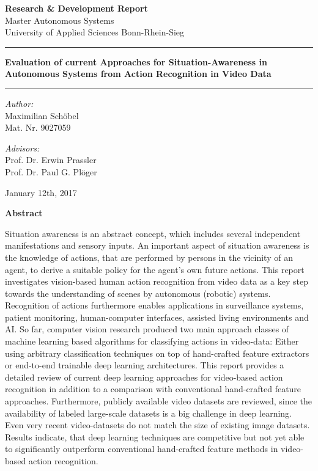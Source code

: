 \documentclass[a4paper, 11pt, listof=totoc, bibliography=totoc]{scrartcl}
\begin{document}
\thispagestyle{empty}
\begin{center}
\large
\textbf{Research \& Development Report} \\
Master Autonomous Systems \\
University of Applied Sciences Bonn-Rhein-Sieg \\
\LARGE

\vspace{1cm}

\vspace{-0.75\baselineskip}\rule{\linewidth}{1.5pt}
\textbf{Evaluation of current Approaches for Situation-Awareness in Autonomous Systems from Action Recognition in Video Data} \\
\vspace{-0.25\baselineskip}\rule{\linewidth}{1.5pt}

\vspace{1cm}

\normalsize
\textit{Author:}\\
Maximilian Schöbel\\
Mat. Nr. 9027059
\bigskip

\textit{Advisors:}\\
Prof. Dr. Erwin Prassler\\
Prof. Dr. Paul G. Plöger\\
\bigskip

January 12th, 2017

\vfill

\textbf{Abstract}
\end{center}
\small
Situation awareness is an abstract concept, which includes several independent manifestations and sensory inputs.
An important aspect of situation awareness is the knowledge of actions, that are performed by persons in the vicinity of an agent, to derive a suitable policy for the agent's own future actions.
This report investigates vision-based human action recognition from video data as a key step towards the understanding of scenes by autonomous (robotic) systems.
Recognition of actions furthermore enables applications in surveillance systems, patient monitoring, human-computer interfaces, assisted living environments and AI.
So far, computer vision research produced two main approach classes of machine learning based algorithms for classifying actions in video-data:
Either using arbitrary classification techniques on top of hand-crafted feature extractors or end-to-end trainable deep learning architectures.
This report provides a detailed review of current deep learning approaches for video-based action recognition in addition to a comparison with conventional hand-crafted feature approaches.
Furthermore, publicly available video datasets are reviewed, since the availability of labeled large-scale datasets is a big challenge in deep learning.
Even very recent video-datasets do not match the size of existing image datasets.
Results indicate, that deep learning techniques are competitive but not yet able to significantly outperform conventional hand-crafted feature methods in video-based action recognition.
\end{document}
